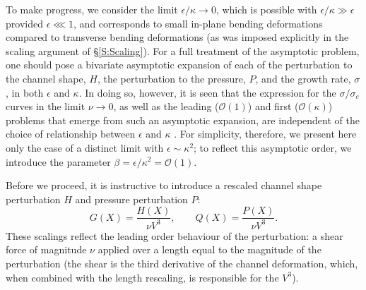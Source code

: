 \documentclass{jfm}
\newcommand{\order}[1]{\mathcal{O}\left(#1\right)}
\begin{document}
To make progress, we consider the limit $\epsilon / \kappa \to 0$, which is possible with $\epsilon/\kappa \gg \epsilon$ provided $\epsilon \lll 1$, and corresponds to small in-plane bending deformations compared to transverse bending deformations (as was imposed explicitly in the scaling argument of \S\ref{S:Scaling}). For a full treatment of the asymptotic problem, one should pose a bivariate asymptotic expansion of each of the perturbation to the channel shape, $H$, the perturbation to the pressure,
$P$, and the growth rate, $\sigma$, in both $\epsilon$ and $\kappa$. In doing so, however, it is seen that the expression for the $\sigma/\sigma_c$ curves in the limit $\nu \to 0$, as well as the leading ($\order{1}$) and first ($\order{\kappa}$) problems that emerge from such an asymptotic expansion, are independent of the choice of relationship between $\epsilon$ and $\kappa$ \cite[see][which contains a complete treatment of this problem]{BradleyPhDthesis}. For simplicity, therefore, we present here only the case of a distinct limit with $\epsilon \sim \kappa^2$; to reflect this asymptotic order, we introduce the parameter $\beta = \epsilon/\kappa^2 = \order{1}$.

Before we proceed, it is instructive to introduce a rescaled channel shape perturbation $H$ and pressure perturbation $P$:
\begin{equation}\label{E:Asymptotics:Rescaling}
G(X) = \frac{H(X)}{\nu V^3}, \qquad Q(X) = \frac{P(X)}{\nu V^3}.
\end{equation}
These scalings reflect the leading order behaviour of the perturbation: a shear force of magnitude $\nu$ applied over a length equal to  the magnitude  of  the  perturbation  (the  shear  is  the  third  derivative  of  the  channel deformation, which, when combined with the length rescaling, is responsible for the $V^3$). 
\end{document}
